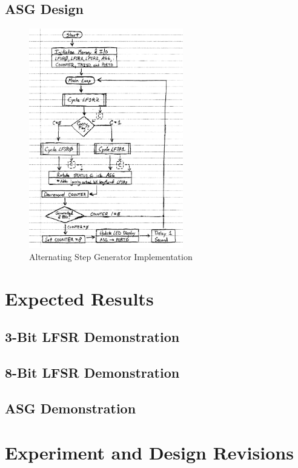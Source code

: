 \documentclass[11pt]{article}
\begin{document}
\subsection{ASG Design}

\begin{figure}
	\centering
	\includegraphics[width=0.6\textwidth]{Figures/alternating-step-generator-flowchart.pdf}
	\caption{Alternating Step Generator Implementation}
	\label{alternating-step-generator-flowchart}
\end{figure}

\section{Expected Results}

\subsection{3-Bit LFSR Demonstration}

\subsection{8-Bit LFSR Demonstration}

\subsection{ASG Demonstration}

\section{Experiment and Design Revisions}
\end{document}
